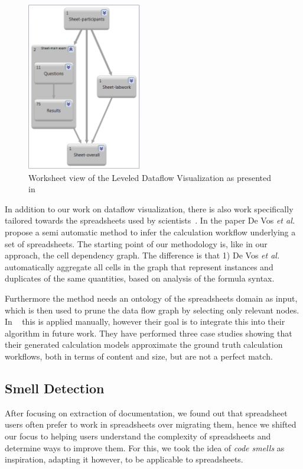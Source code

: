 \documentclass[conference]{IEEEtran}
\begin{document}
\begin{figure}
  \begin{center}
  \includegraphics[width=5cm]{fig/worksheet-view.png}
  \caption{Worksheet view of the Leveled Dataflow Visualization as presented in \cite{hermans_supporting_2011}}
  \label{fig:worksheet-view}
  \end{center}
\end{figure} 

In addition to our work on dataflow visualization, there is also work specifically tailored towards the spreadsheets used by scientists~\cite{de_vos_methodology_2015}. In the paper De Vos \emph{et al.} propose a semi automatic method to infer the calculation workflow underlying a set of spreadsheets. The starting point of our methodology is, like in our approach, the cell dependency graph. The difference is that 1) De Vos \emph{et al.} automatically aggregate all cells in the graph that represent instances and duplicates of the same quantities, based on analysis of the formula syntax.

Furthermore the method needs an ontology of the spreadsheets domain as input, which is then used to prune the data flow graph by selecting only relevant nodes. In ~\cite{de_vos_methodology_2015} this is applied manually, however their goal is to integrate this into their algorithm in future work. They have performed three case studies showing that their generated calculation models
approximate the ground truth calculation workflows, both in terms of content and size, but are not a perfect match.

\subsection{Smell Detection} 
After focusing on extraction of documentation, we found out that spreadsheet users often prefer to work in spreadsheets over migrating them, hence we shifted our focus to helping users understand the complexity of spreadsheets and determine ways to improve them. For this, we took the idea of \emph{code smells} as inspiration, adapting it however, to be applicable to spreadsheets. 
\end{document}
